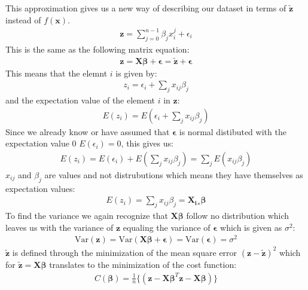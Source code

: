 \documentclass[12pt]{article}
\begin{document}
This approximation gives us a new way of describing our dataset in terms of $\boldsymbol{\tilde{z}}$ instead of $f(\boldsymbol{x})$.
\begin{align*}
  \boldsymbol{z} = \sum_{j=0}^{n-1}\beta_jx_i^j + \epsilon_i
\end{align*}
This is the same as the following matrix equation:
\begin{align*}
  \boldsymbol{z} = \boldsymbol{X}\boldsymbol{\beta} + \boldsymbol{\epsilon} = \boldsymbol{\tilde{z}} + \boldsymbol{\epsilon}
\end{align*}
This means that the elemnt $i$ is given by:
\begin{align*}
  z_i = \epsilon_i + \sum_j x_{ij}\beta_j
\end{align*}
and the expectation value of the element $i$ in $\boldsymbol{z}$:
\begin{align*}
  E(z_i) = E(\epsilon_i + \sum_j x_{ij}\beta_j)
\end{align*}
Since we already know or have assumed that $\boldsymbol{\epsilon}$ is normal distibuted with the expectation value 0 $E(\epsilon_i)=0$, this gives us:
\begin{align*}
  E(z_i) = E(\epsilon_i) + E(\sum_j x_{ij}\beta_j) = \sum_jE(x_{ij}\beta_j)
\end{align*}
$x_{ij}$ and $\beta_j$ are values and not distrubutions which means they have themselves as expectation values:
\begin{align*}
    E(z_i) = \sum_jx_{ij}\beta_j = \boldsymbol{X_i}_*\boldsymbol{\beta}
\end{align*}
To find the variance we again recognize that $\boldsymbol{X}\boldsymbol{\beta}$ follow no distribution which leaves us with the variance of $\boldsymbol{z}$ equaling the variance of $\boldsymbol{\epsilon}$ which is given as $\sigma^2$:
\begin{align*}
  \text{Var}(\boldsymbol{z}) = \text{Var}(\boldsymbol{X}\boldsymbol{\beta} + \boldsymbol{\epsilon}) = \text{Var}(\boldsymbol{\epsilon}) = \sigma^2
\end{align*}
$\boldsymbol{\tilde{z}}$ is defined through the minimization of the mean square error $(\boldsymbol{z} - \boldsymbol{\tilde{z}})^2$ which for $\boldsymbol{\tilde{z}} = \boldsymbol{X}\boldsymbol{\beta}$ translates to the minimization of the cost function:
\begin{align*}
  C(\boldsymbol{\beta}) = \frac{1}{ n}\{(\boldsymbol{z}- \boldsymbol{X}\boldsymbol{\beta}^T\boldsymbol{z}- \boldsymbol{X}\boldsymbol{\beta})\}
\end{align*}
\end{document}
